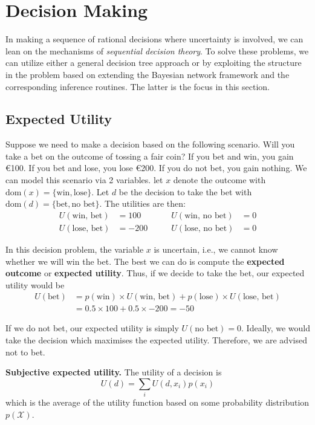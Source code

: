 \documentclass{article}
\begin{document}
\clearpage
\section{Decision Making}

In making a sequence of rational decisions where uncertainty is involved, we can lean on the mechanisms of \textit{sequential decision theory}. To solve these problems, we can utilize either a general decision tree approach or by exploiting the structure in the problem based on extending the Bayesian network framework and the corresponding inference routines. The latter is the focus in this section. 

\subsection{Expected Utility}

Suppose we need to make a decision based on the following scenario. Will you take a bet on the outcome of tossing a fair coin? If you bet and win, you gain \euro{100}. If you bet and lose, you lose \euro{200}. If you do not bet, you gain nothing. We can model this scenario via 2 variables. let $x$ denote the outcome with $\text{dom}(x) = \{\text{win}, \text{lose}\}$. Let $d$ be the decision to take the bet with $\text{dom}(d) = \{\text{bet}, \text{no bet}\}$. The utilities are then:
\begin{align*}
    U(\text{win, bet}) &= 100 \qquad& U(\text{win, no bet}) &= 0 \\
    U(\text{lose, bet}) &= -200 \qquad& U(\text{lose, no bet}) &= 0
\end{align*}

\noindent In this decision problem, the variable $x$ is uncertain, i.e., we cannot know whether we will win the bet. The best we can do is compute the \textbf{expected outcome} or \textbf{expected utility}. Thus, if we decide to take the bet, our expected utility would be
\begin{align*}
    U(\text{bet}) &= p(\text{win}) \times U(\text{win, bet}) + p(\text{lose}) \times U(\text{lose, bet})\\
    &= 0.5 \times 100 + 0.5 \times -200 = -50
\end{align*}

\noindent If we do not bet, our expected utility is simply $U(\text{no bet}) = 0$. Ideally, we would take the decision which maximises the expected utility. Therefore, we are advised not to bet. 
\\
\begin{theorem}
    \textbf{Subjective expected utility.} The utility of a decision is
    $$
        U(d) = \sum_i U(d, x_i) p(x_i)
    $$
    which is the average of the utility function based on some probability distribution $p(\mathcal{X})$.
\end{theorem}
\end{document}
